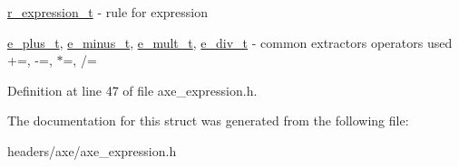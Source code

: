 \hyperlink{structaxe_1_1r__expression__t}{r\+\_\+expression\+\_\+t} -\/ rule for expression 

\hyperlink{structaxe_1_1e__plus__t}{e\+\_\+plus\+\_\+t}, \hyperlink{structaxe_1_1e__minus__t}{e\+\_\+minus\+\_\+t}, \hyperlink{structaxe_1_1e__mult__t}{e\+\_\+mult\+\_\+t}, \hyperlink{structaxe_1_1e__div__t}{e\+\_\+div\+\_\+t} -\/ common extractors operators used +=, -\/=, $\ast$=, /= 

Definition at line 47 of file axe\+\_\+expression.\+h.



The documentation for this struct was generated from the following file\+:\begin{DoxyCompactItemize}
\item 
headers/axe/axe\+\_\+expression.\+h\end{DoxyCompactItemize}
